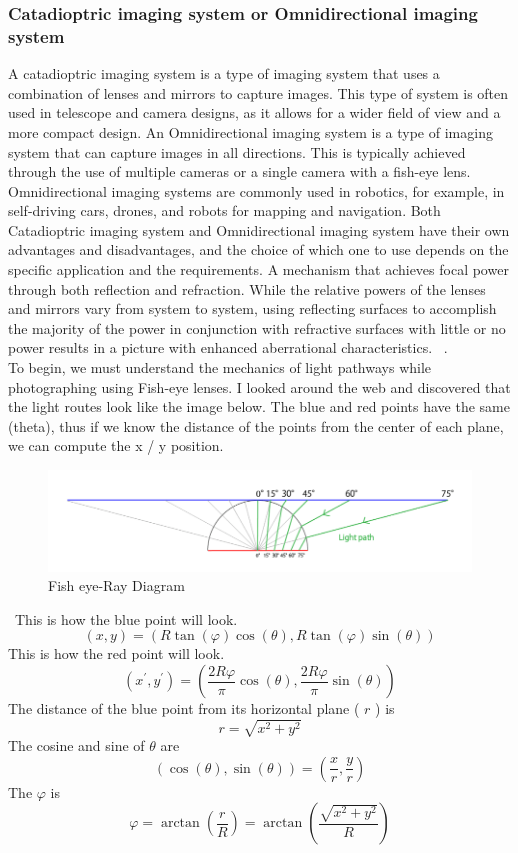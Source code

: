 \documentclass[11pt, a4paper, openany]{book}
\begin{document}
\subsubsection{Catadioptric imaging system or Omnidirectional imaging system}
A catadioptric imaging system is a type of imaging system that uses a combination of lenses and mirrors to capture images. This type of system is often used in telescope and camera designs, as it allows for a wider field of view and a more compact design.
\newline
An Omnidirectional imaging system is a type of imaging system that can capture images in all directions. This is typically achieved through the use of multiple cameras or a single camera with a fish-eye lens. Omnidirectional imaging systems are commonly used in robotics, for example, in self-driving cars, drones, and robots for mapping and navigation.
Both Catadioptric imaging system and Omnidirectional imaging system have their own advantages and disadvantages, and the choice of which one to use depends on the specific application and the requirements.
A mechanism that achieves focal power through both reflection and refraction. While the relative powers of the lenses and mirrors vary from system to system, using reflecting surfaces to accomplish the majority of the power in conjunction with refractive surfaces with little or no power results in a picture with enhanced aberrational characteristics.
~\cite{swaminathan2007focus}. \\
To begin, we must understand the mechanics of light pathways while photographing using Fish-eye lenses. I looked around the web and discovered that the light routes look like the image below.
The blue and red points have the same (theta), thus if we know the distance of the points from the center of each plane, we can compute the x / y position.\newline
\begin{figure}[H]
    \centering
    \includegraphics[scale=0.5]{Labbot&ele/5.png}
    \caption{Fish eye-Ray Diagram~\cite{bettonvil2005fisheye}}
    \label{fig:ray}
\end{figure}\
This is how the blue point will look.
$$
(x, y)=(R \tan (\varphi) \cos (\theta), R \tan (\varphi) \sin (\theta))
$$
This is how the red point will look.
$$
\left(x^{\prime}, y^{\prime}\right)=\left(\frac{2 R \varphi}{\pi} \cos (\theta), \frac{2 R \varphi}{\pi} \sin (\theta)\right)
$$
The distance of the blue point from its horizontal plane ( $r$ ) is
$$
r=\sqrt{x^2+y^2}
$$
The cosine and sine of $\theta$ are
$$
(\cos (\theta), \sin (\theta))=\left(\frac{x}{r}, \frac{y}{r}\right)
$$
The $\varphi$ is
$$
\varphi=\arctan \left(\frac{r}{R}\right)=\arctan \left(\frac{\sqrt{x^2+y^2}}{R}\right)
$$
\end{document}
